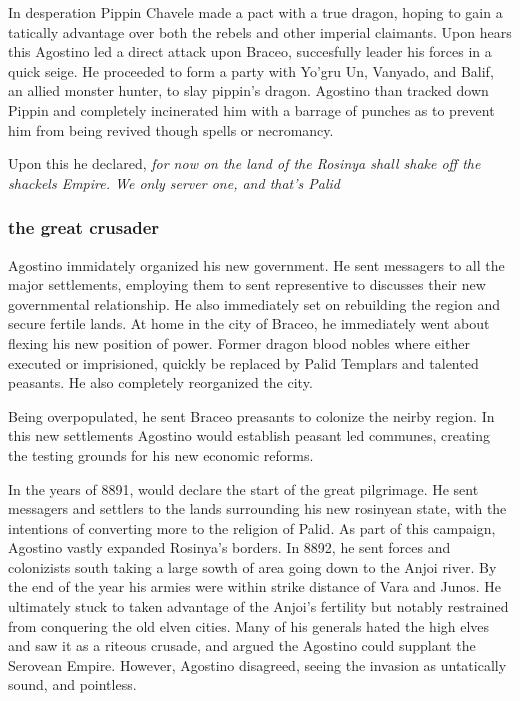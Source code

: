 \documentclass[../main.tex]{subfiles}
\begin{document}
In desperation Pippin Chavele made a pact with a true dragon, hoping to gain a tatically advantage over
both the rebels and other imperial claimants. Upon hears this Agostino led a direct attack upon Braceo, 
succesfully leader his forces in a quick seige. He proceeded to form a party with Yo'gru Un, Vanyado, and
Balif, an allied monster hunter, to slay pippin's dragon. Agostino than tracked down Pippin and completely
incinerated him with a barrage of punches as to prevent him from being revived though spells or necromancy.

Upon this he declared, \emph{for now on the land of the Rosinya shall shake off the shackels Empire.
We only server one, and that's Palid}

\subsubsection{the great crusader}
Agostino immidately organized his new government. He sent messagers to all the major settlements,
employing them to sent representive to discusses their new governmental relationship. He also immediately 
set on rebuilding the region and secure fertile lands. At home in the city of Braceo, he immediately went 
about flexing his new position of power. Former dragon blood nobles where either executed or imprisioned,
quickly be replaced by Palid Templars and talented peasants. He also completely reorganized the city.

Being overpopulated, he sent Braceo preasants to colonize the neirby region. In this new settlements
Agostino would establish peasant led communes, creating the testing grounds for his new economic reforms. 


In the years of 8891, would declare the start of the great pilgrimage. He sent messagers and settlers to the lands 
surrounding his new rosinyean state, with the intentions of converting more to the religion of Palid. As part of this
campaign, Agostino vastly expanded Rosinya's borders. In 8892, he sent forces and colonizists south taking a large 
sowth of area going down to the Anjoi river. By the end of the year his armies were within strike distance of Vara
and Junos. He ultimately stuck to taken advantage of the Anjoi's fertility but notably restrained from conquering the 
old elven cities. Many of his generals hated the high elves and saw it as a riteous crusade, and argued the Agostino
could supplant the Serovean Empire. However, Agostino disagreed, seeing the invasion as untatically sound, and pointless. 
\end{document}
